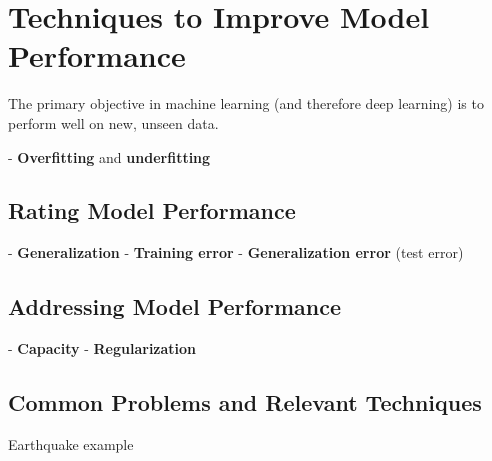 \section{Techniques to Improve Model Performance} %

The primary objective in machine learning (and therefore deep learning) is to perform well on new, unseen data. 

- \textbf{Overfitting} and \textbf{underfitting}

\subsection{Rating Model Performance}
- \textbf{Generalization}
- \textbf{Training error}  
- \textbf{Generalization error} (test error)

\subsection{Addressing Model Performance}
- \textbf{Capacity}
- \textbf{Regularization}

\subsection{Common Problems and Relevant Techniques}

Earthquake example